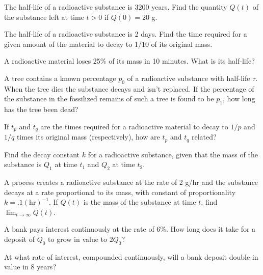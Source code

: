 \begin{exerciselist}
  \item\label{exer:4.1.1} The half-life of a radioactive substance is 3200 years. Find the quantity
        $Q(t)$ of the substance left at time $t>0$ if $Q(0)=20$ g.

  \item\label{exer:4.1.2} The half-life of a radioactive substance is 2 days. Find the time required
        for a given amount of the material to decay to 1/10 of its original mass.

  \item\label{exer:4.1.3} A radioactive material loses 25\% of its mass in 10 minutes. What is its
        half-life?

  \item\label{exer:4.1.4} A tree contains a known percentage $p_{0}$ of a radioactive substance with
        half-life $\tau$. When the tree dies the substance decays and isn't replaced. If the
        percentage of the substance in the fossilized remains of such a tree is found to be $p_{1}$,
        how long has the tree been dead?

  \item\label{exer:4.1.5} If $t_{p}$ and $t_{q}$ are the times required for a radioactive material
        to decay to $1/p$ and $1/q$ times its original mass (respectively), how are $t_{p}$ and
        $t_{q}$ related?

  \item\label{exer:4.1.6} Find the decay constant $k$ for a radioactive substance, given that the
        mass of the substance is $Q_{1}$ at time $t_{1}$ and $Q_{2}$ at time $t_{2}$.

  \item\label{exer:4.1.7} A process creates a radioactive substance at the rate of 2 g/hr and the
        substance decays at a rate proportional to its mass, with constant of proportionality
        $k=.1(\mbox{hr})^{-1}$. If $Q(t)$ is the mass of the substance at time $t$, find
        $\lim_{t\to\infty}Q(t)$.

  \item\label{exer:4.1.8} A bank pays interest continuously at the rate of 6\%. How long does it
        take for a deposit of $Q_{0}$ to grow in value to $2Q_{0}$?

  \item\label{exer:4.1.9} At what rate of interest, compounded continuously, will a bank deposit
        double in value in 8 years?


\end{exerciselist}
